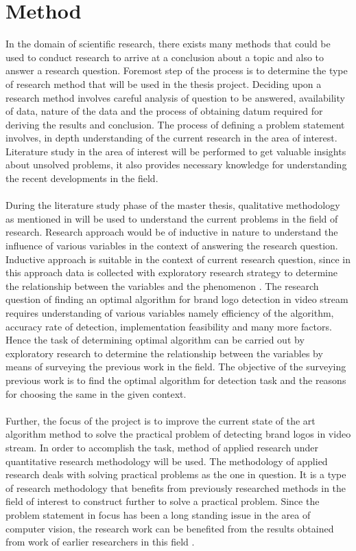 \section{Method}
  
  In the domain of scientific research, there exists many methods that could be used to conduct research to arrive at a conclusion about a topic and also to answer a research question. Foremost step of the process is to determine the type of research method that will be used in the thesis project. Deciding upon a research method involves careful analysis of question to be answered, availability of data, nature of the data and the process of obtaining datum required for deriving the results and conclusion. The process of defining a problem statement involves, in depth understanding of the current research in the area of interest. Literature study in the area of interest will be performed to get valuable insights about unsolved problems, it also provides necessary knowledge for understanding the recent developments in the field. 
  \\ \\
  During the literature study phase of the master thesis, qualitative methodology as mentioned in \cite{haakansson2013portal} will be used to understand the current problems in the field of research. Research approach would be of inductive in nature to understand the influence of various variables in the context of answering the research question. Inductive approach is suitable in the context of current research question, since in this approach data is collected with exploratory research strategy to determine the relationship between the variables and the phenomenon \cite{haakansson2013portal}. The research question of finding an optimal algorithm for brand logo detection in video stream requires understanding of various variables namely efficiency of the algorithm, accuracy rate of detection, implementation feasibility and many more factors. Hence the task of determining optimal algorithm can be carried out by exploratory research to determine the relationship between the variables \cite{haakansson2013portal} by means of surveying the previous work in the field. The objective of the surveying previous work is to find the optimal algorithm for detection task and the reasons for choosing the same in the given context.         
  \\ \\
  Further, the focus of the project is to improve the current state of the art algorithm method to solve the practical problem of detecting brand logos in video stream. In order to accomplish the task, method of applied research under quantitative research methodology \cite{haakansson2013portal} will be used. The methodology of applied research deals with solving practical problems as the one in question. It is a type of research methodology that benefits from previously researched methods in the field of interest to construct further to solve a practical problem. Since the problem statement in focus has been a long standing issue in the area of computer vision, the research work can be benefited from the results obtained from work of earlier researchers in this field \cite{haakansson2013portal}. 

